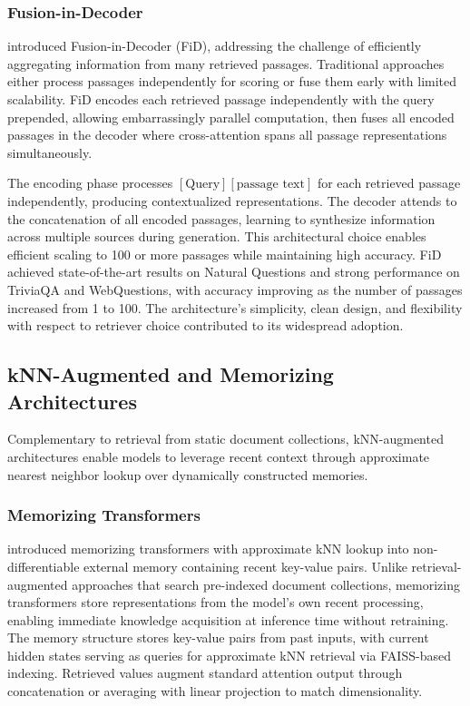 \subsubsection{Fusion-in-Decoder}

\citet{izacard2020leveraging} introduced Fusion-in-Decoder (FiD), addressing the challenge of efficiently aggregating information from many retrieved passages. Traditional approaches either process passages independently for scoring or fuse them early with limited scalability. FiD encodes each retrieved passage independently with the query prepended, allowing embarrassingly parallel computation, then fuses all encoded passages in the decoder where cross-attention spans all passage representations simultaneously.

The encoding phase processes $[\text{Query}][\text{passage text}]$ for each retrieved passage independently, producing contextualized representations. The decoder attends to the concatenation of all encoded passages, learning to synthesize information across multiple sources during generation. This architectural choice enables efficient scaling to 100 or more passages while maintaining high accuracy. FiD achieved state-of-the-art results on Natural Questions and strong performance on TriviaQA and WebQuestions, with accuracy improving as the number of passages increased from 1 to 100. The architecture's simplicity, clean design, and flexibility with respect to retriever choice contributed to its widespread adoption.

\subsection{kNN-Augmented and Memorizing Architectures}

Complementary to retrieval from static document collections, kNN-augmented architectures enable models to leverage recent context through approximate nearest neighbor lookup over dynamically constructed memories.

\subsubsection{Memorizing Transformers}

\citet{wu2022memorizing} introduced memorizing transformers with approximate kNN lookup into non-differentiable external memory containing recent key-value pairs. Unlike retrieval-augmented approaches that search pre-indexed document collections, memorizing transformers store representations from the model's own recent processing, enabling immediate knowledge acquisition at inference time without retraining. The memory structure stores key-value pairs from past inputs, with current hidden states serving as queries for approximate kNN retrieval via FAISS-based indexing. Retrieved values augment standard attention output through concatenation or averaging with linear projection to match dimensionality.

